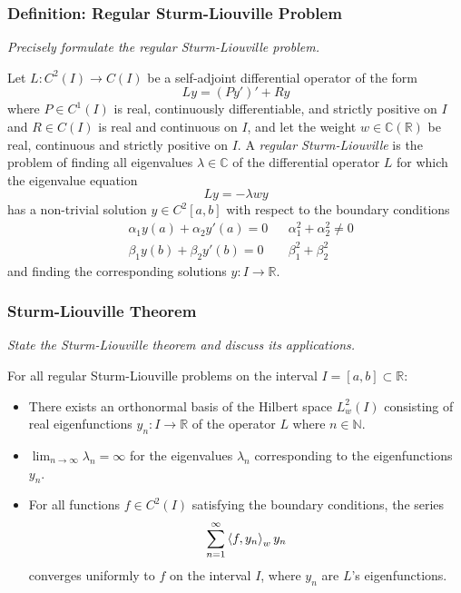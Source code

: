 \documentclass[11pt, a4paper]{article}
\newcommand{\question}[1]{\textit{#1}\vspace{2mm}}
\newcommand{\R}{\mathbb{R}} %
\newcommand{\C}{\mathbb{C}} %
\begin{document}
\subsubsection{Definition: Regular Sturm-Liouville Problem}
\question{Precisely formulate the regular Sturm-Liouville problem.}

Let $ L: C^2(I) \to C(I) $ be a self-adjoint differential operator of the form
\begin{equation*}
	Ly = (Py')' + Ry
\end{equation*}
where $ P \in C^1(I) $ is real, continuously differentiable, and strictly positive on $ I $ and $ R \in C(I)$ is real and continuous on $ I $, and let the weight $ w \in \C(\R) $ be real, continuous and strictly positive on $ I $. A \textit{regular Sturm-Liouville} is the problem of finding all eigenvalues $ \lambda \in \C $ of the differential operator $ L $ for which the eigenvalue equation
\begin{equation*}
	Ly = -\lambda w y
\end{equation*}
has a non-trivial solution $ y \in C^2[a, b] $ with respect to the boundary conditions
\begin{align*}
	&\alpha_1 y(a) + \alpha_2 y'(a) = 0 && \alpha_1^2 + \alpha_2^2 \neq 0\\
	&\beta_1y(b) + \beta_2 y'(b) = 0 &&  \beta_1^2 + \beta_2^2
\end{align*}
and finding the corresponding solutions $ y : I \to \R $.

\subsubsection{Sturm-Liouville Theorem}
\question{State the Sturm-Liouville theorem and discuss its applications.}

For all regular Sturm-Liouville problems on the interval $ I = [a, b] \subset \R $:
\begin{itemize}
	\item There exists an orthonormal basis of the Hilbert space $ L_{w}^2(I) $ consisting of real eigenfunctions $ y_n :I \to \R $ of the operator $ L $ where $ n \in \mathbb{N} $.
	
	\item  $ \displaystyle{\lim_{n \to \infty} \lambda_n = \infty} $ for the eigenvalues $ \lambda_n $ corresponding to the eigenfunctions $ y_n $.
	
	\item For all functions $ f \in C^2(I) $ satisfying the boundary conditions, the series
	\begin{equation*}
		\sum_{n=1}^{\infty}\expval{f, y_n}_{w}y_n
	\end{equation*}
	converges uniformly to $ f $ on the interval $ I $, where $ y_{n} $ are $ L $'s eigenfunctions.
\end{itemize}
\end{document}
